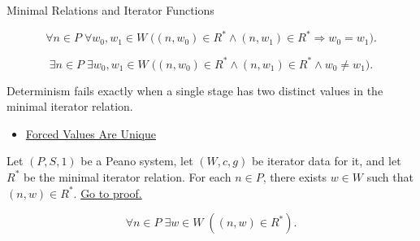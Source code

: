 \begin{topicbox}{Minimal Relations and Iterator Functions}
\begin{remark*}
\[
\forall n\in P\;\forall w_0,w_1\in W\;
\bigl((n,w_0)\in R^*\land (n,w_1)\in R^*\Longrightarrow w_0=w_1\bigr).
\]
\end{remark*}


\begin{remark*}
\[
\exists n\in P\;\exists w_0,w_1\in W\;
\bigl((n,w_0)\in R^*\land (n,w_1)\in R^*\land w_0\neq w_1\bigr).
\]
\end{remark*}

\begin{remark*}
Determinism fails exactly when a single stage has two distinct values in the
minimal iterator relation.
\end{remark*}

\begin{remark*}[Dependencies]
\begin{itemize}
  \item \hyperref[lem:forced-values-are-unique]{Forced Values Are Unique}
\end{itemize}
\end{remark*}

\begin{tcolorbox}[colback=lembox, colframe=lemborder, arc=2pt,
  left=6pt, right=6pt, top=4pt, bottom=4pt,
  title={\small\textbf{Lemma (Completeness of the Minimal Iterator Relation)}},
  fonttitle=\small\bfseries]
\begin{lemma}
\label{lem:minimal-iterator-relation-complete}
Let $(P,S,1)$ be a Peano system, let $(W,c,g)$ be iterator data for it, and let
$R^*$ be the minimal iterator relation. For each $n\in P$, there exists
$w\in W$ such that $(n,w)\in R^*$.
\hyperref[prf:minimal-iterator-relation-complete]{Go to proof.}
\end{lemma}
\end{tcolorbox}

\begin{remark*}
\[
\forall n\in P\;\exists w\in W\;((n,w)\in R^*).
\]
\end{remark*}



\end{topicbox}
